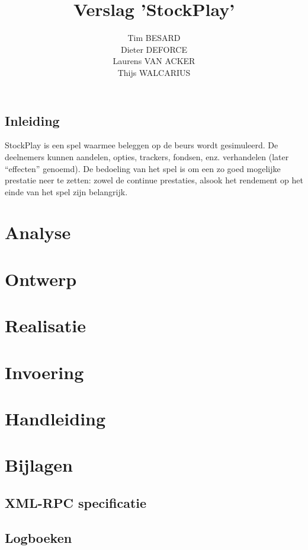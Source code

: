 \documentclass[a4paper,oneside,final]{memoir}
\title{Verslag 'StockPlay'}
\author{
Tim BESARD\\
Dieter DEFORCE\\
Laurens VAN ACKER\\
Thijs WALCARIUS
}
\begin{document}
\maketitle
{}
\tableofcontents
{}


%
%

\chapter*{Inleiding}
StockPlay is een spel waarmee beleggen op de beurs wordt gesimuleerd. De deelnemers kunnen aandelen, opties, trackers, fondsen, enz. verhandelen (later ``effecten'' genoemd). De bedoeling van het spel is om een zo goed mogelijke prestatie neer te zetten: zowel de continue prestaties, alsook het rendement op het einde van het spel zijn belangrijk.

\part{Analyse}


\part{Ontwerp}


\part{Realisatie}


\part{Invoering}


\part{Handleiding}


%
%

\part{Bijlagen}
\appendix

\chapter{XML-RPC specificatie}


\chapter{Logboeken}

\end{document}

